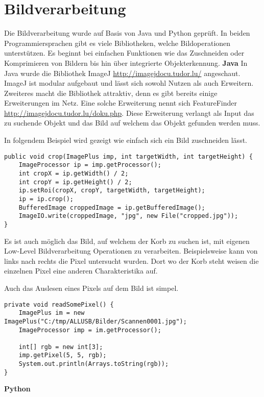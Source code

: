 \section{Bildverarbeitung}
Die Bildverarbeitung wurde auf Basis von Java und Python geprüft. In beiden Programmiersprachen gibt es viele Bibliotheken, welche Bildoperationen unterstützen. Es beginnt bei einfachen Funktionen wie das Zuschneiden oder Komprimieren von Bildern bis hin über integrierte Objekterkennung.\newline
\newline
\textbf{Java}\newline
In Java wurde die Bibliothek ImageJ \href{http://imagejdocu.tudor.lu/}{http://imagejdocu.tudor.lu/} angeschaut. ImageJ ist modular aufgebaut und lässt sich sowohl Nutzen als auch Erweitern. Zweiteres macht die Bibliothek attraktiv, denn es gibt bereits einige Erweiterungen im Netz. Eine solche Erweiterung nennt sich FeatureFinder \href{http://imagejdocu.tudor.lu/doku.php?id=plugin:analysis:feature_finder:start}{http://imagejdocu.tudor.lu/doku.php}. Diese Erweiterung verlangt als Input das zu suchende Objekt und das Bild auf welchem das Objekt gefunden werden muss. \newline
\newline

In folgendem Beispiel wird gezeigt wie einfach sich ein Bild zuschneiden lässt.
\begin{lstlisting}
public void crop(ImagePlus imp, int targetWidth, int targetHeight) {
	ImageProcessor ip = imp.getProcessor();
	int cropX = ip.getWidth() / 2;
	int cropY = ip.getHeight() / 2;
	ip.setRoi(cropX, cropY, targetWidth, targetHeight);
	ip = ip.crop();
	BufferedImage croppedImage = ip.getBufferedImage();
	ImageIO.write(croppedImage, "jpg", new File("cropped.jpg"));
}
\end{lstlisting}

Es ist auch möglich das Bild, auf welchem der Korb zu suchen ist, mit eigenen Low-Level Bildverarbeitung Operationen zu verarbeiten. Beispielsweise kann von links nach rechts die Pixel untersucht wurden. Dort wo der Korb steht weisen die einzelnen Pixel eine anderen Charakteristika auf.

Auch das Auslesen eines Pixels auf dem Bild ist simpel.
\begin{lstlisting}
private void readSomePixel() {
	ImagePlus im = new ImagePlus("C:/tmp/ALLUSB/Bilder/Scannen0001.jpg");
	ImageProcessor imp = im.getProcessor();

	int[] rgb = new int[3];
	imp.getPixel(5, 5, rgb);
	System.out.println(Arrays.toString(rgb));
}
\end{lstlisting}


\textbf{Python}


